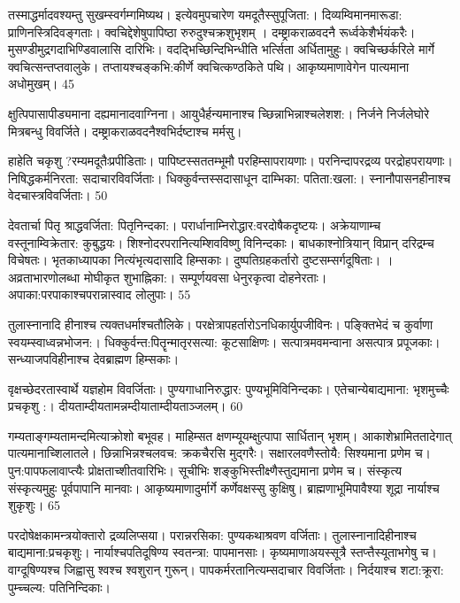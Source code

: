   तस्माद्धर्मादवश्यम्तु सुखम्स्वर्गम्गमिष्यथ।
 इत्येवमुपचारेण यमदूतैस्सुपूजिता:।
 दिव्यम्विमानमारूडा: प्राणिनस्त्रिदिवङ्गताः।
 क्वचिद्देशेषुपापिष्ठा रुरुदुश्चक्रशुभृशम् ।
 दम्ष्ट्राकराळवदनै रूर्ध्वकेशैर्भयंकरैः।
 मुसण्डीमुद्रगदाभिण्डिवालासि दारिभिः।
 वदद्भिच्छिन्दिभिन्धीति भर्त्सिता अर्धितामुहुः।
 क्वचिच्छर्करिले मार्गे क्वचित्सन्तप्तवालुके।
 तप्तायश्चङ्कभि:कीर्णे क्वचित्कण्ठकिते पथि।
 आकृष्यमाणावेगेन पात्यमाना अधोमुखम्।
 45

  क्षुत्पिपासापीड्यमाना दह्यमानादवाग्निना।
 आयुधैर्हन्यमानाश्च च्छिन्नाभिन्नाश्चलेशश:।
 निर्जने निर्जलेघोरे मित्रबन्धु विवर्जिते।
 दम्ष्ट्राकराळवदनैश्वभिर्दष्टाश्च मर्मसु।
 

हाहेति चकृशु ?रम्यमदूतैःप्रपीडिताः।
 पापिष्टस्सततम्भूमौ परहिम्सापरायणाः।
 परनिन्दापरद्रव्य परद्रोहपरायणाः।
 निषिद्धकर्मनिरता: सदाचारविवर्जिताः।
 धिक्कुर्वन्तस्सदासाधून दाम्भिका: पतिता:खला:।
 स्नानौपासनहीनाश्च वेदचास्त्रविवर्जिताः।
 50

  देवतार्चा पितृ श्राद्धवर्जिता: पितृनिन्दका:।
 परार्धानाम्निरोद्धार:वरदोषैकदृष्टयः।
 अक्रेयाणाम्च वस्तूनाम्विक्रेतार: कुबुद्धयः।
 शिश्नोदरपरानित्यम्शिवविष्णु विनिन्दकाः।
 बाधकाश्नोत्रियान् विप्रान् दरिद्रम्च विचेषतः।
 भृतकाध्यापका नित्यंभृत्यदासादि हिम्सकाः।
 दुष्पतिग्रहकर्तारो दुष्टसम्सर्गदूषिताः।
 ।
 अव्रताभारणोलब्धा मोघीकृत शुभाह्निका:।
 सम्पूर्णयवसा धेनुरकृत्वा दोहनेरताः।
 अपाका:परपाकाश्चपरान्नास्वाद लोलुपाः।
 55

  तुलास्नानादि हीनाश्च त्यक्तधर्माश्चतौलिके।
 परक्षेत्रापहर्तारोऽनधिकार्युपजीविनः।
 पङ्क्तिभेदं च कुर्वाणा स्वयम्स्वाध्वन्नभोजन:।
 धिक्कुर्वन्त:पितॄन्मातृरसत्या: कूटसाक्षिणः।
 सत्पात्रमवमन्वाना असत्पात्र प्रपूजकाः।
 सन्ध्याजपविहीनाश्च देवब्राह्मण हिम्सकाः।
 

वृक्षच्छेदरतास्वार्थे यज्ञहोम विवर्जिताः।
 पुण्यगाधानिरुद्धार: पुण्यभूमिविनिन्दकाः।
 एतेचान्येबाद्यमाना: भृशमुच्चैः प्रचकृशु :।
 दीयताम्दीयतामन्नम्दीयाताम्दीयताञ्जलम्।
 60

  गम्यताङ्गम्यतामन्दमित्याक्रोशो बभूवह।
 माहिम्सत क्षणम्यूयम्क्षुत्पापा सार्धितान् भृशम्।
 आकाशेभ्रामिततादेगात् पात्यमानाच्शिलातले।
 छिन्नाभिन्नश्चलवच: क्रकचैरसि मुद्गरैः।
 सक्षारलवणैस्तोयै: सिश्यमाना प्रणेम च।
 पुन:पापफलावाप्त्यैः प्रोक्षताच्शीतवारिभिः।
 सूचीभिः शङ्कुभिस्तीक्ष्णैस्तुद्यमाना प्रणेम च।
 संस्कृत्य संस्कृत्यमुहुः पूर्वपापानि मानवाः।
 आकृष्यमाणादुर्मार्गे कर्णेवक्षस्सु कुक्षिषु।
 ब्राह्मणाभूमिपावैश्या शूद्रा नार्याश्च शुकृशुः।
 65

  परदोषेक्षकामन्त्रयोक्तारो द्रव्यलिप्सया।
 परान्नरसिका: पुण्यकथाश्रवण वर्जिताः।
 तुलास्नानादिहीनाश्च बाद्यमाना:प्रचकृशुः।
 नार्याश्चपतिदूषिण्य स्वतन्त्रा: पापमानसाः।
 कृष्यमाणाअयस्सूत्रै स्तप्त्तैस्यूताभगेषु च।
 वाग्दूषिण्यश्च जिह्वासु श्वश्च श्वशुरान् गुरून्।
 पापकर्मरतानित्यम्सदाचार विवर्जिताः।
 निर्दयाश्च शटा:क्रूरा: पुम्च्चल्य: पतिनिन्दिकाः।
 

